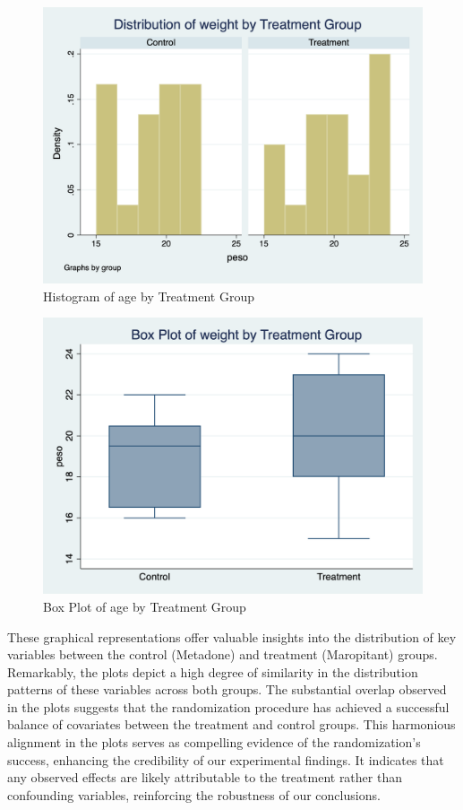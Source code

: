 \documentclass{article}
\begin{document}
\begin{figure}[h]
\centering
\includegraphics[scale=0.30]{histogram_peso_ntrad.png}
\caption{Histogram of age by Treatment Group}
\end{figure}

\begin{figure}[h]
\centering
\includegraphics[scale=0.30]{box_plot_peso_ntrad.png}
\caption{Box Plot of age by Treatment Group}
\end{figure}
These graphical representations offer valuable insights into the distribution of key variables between the control
(Metadone) and treatment (Maropitant) groups. Remarkably, the plots depict a high degree of similarity in the
distribution patterns of these variables across both groups. The substantial overlap observed in the plots suggests that
the randomization procedure has achieved a successful balance of covariates between the treatment and control groups.
This harmonious alignment in the plots serves as compelling evidence of the randomization's success, enhancing the
credibility of our experimental findings. It indicates that any observed effects are likely attributable to the
treatment rather than confounding variables, reinforcing the robustness of our conclusions. 
\end{document}
